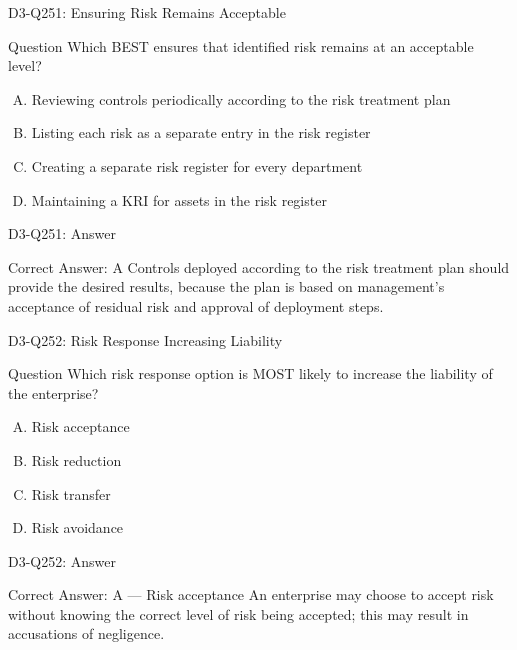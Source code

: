 \documentclass{beamer}
\begin{document}
	\begin{frame}{D3-Q251: Ensuring Risk Remains Acceptable}
		\begin{block}{Question}
			Which BEST ensures that identified risk remains at an acceptable level?
		\end{block}
		\begin{enumerate}[(A)]
			\item Reviewing controls periodically according to the risk treatment plan
			\item Listing each risk as a separate entry in the risk register
			\item Creating a separate risk register for every department
			\item Maintaining a KRI for assets in the risk register
		\end{enumerate}
	\end{frame}
	\begin{frame}{D3-Q251: Answer}
		\begin{block}{Correct Answer: A}
			Controls deployed according to the risk treatment plan should provide the desired results, because the plan is based on management's acceptance of residual risk and approval of deployment steps.
		\end{block}
	\end{frame}
	
	\begin{frame}{D3-Q252: Risk Response Increasing Liability}
		\begin{block}{Question}
			Which risk response option is MOST likely to increase the liability of the enterprise?
		\end{block}
		\begin{enumerate}[(A)]
			\item Risk acceptance
			\item Risk reduction
			\item Risk transfer
			\item Risk avoidance
		\end{enumerate}
	\end{frame}
	\begin{frame}{D3-Q252: Answer}
		\begin{block}{Correct Answer: A --- Risk acceptance}
			An enterprise may choose to accept risk without knowing the correct level of risk being accepted; this may result in accusations of negligence.
		\end{block}
	\end{frame}
	
\end{document}
